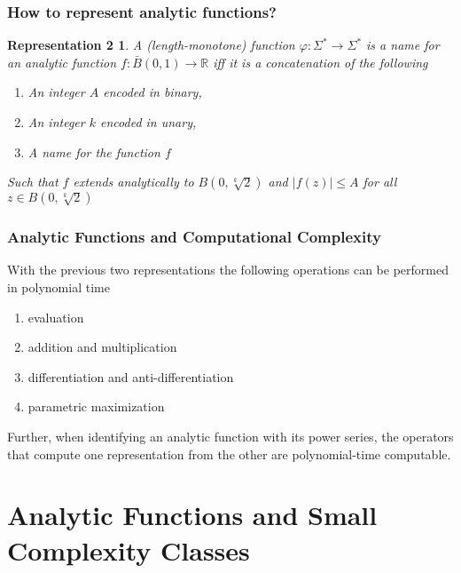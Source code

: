 \documentclass[xcolor=pdftex,dvipsnames,table]{beamer}
\newcommand{\R}{\ensuremath{\mathbb{R}}}
\newcommand{\abs}[1]{\left|#1\right|}
\newtheorem{representation2}{Representation 2}
\begin{document}
\begin{frame}
\frametitle{How to represent analytic functions?}
\begin{representation2}
  A (length-monotone) function $\varphi: \Sigma^* \to \Sigma^*$ is a name for an analytic function $f:\bar B(0,1) \to \R$ iff it is a concatenation of the following  
  \begin{enumerate}
  \item An integer $A$ encoded in binary,
  \item An integer $k$ encoded in unary,
  \item A name for the function $f$
  \end{enumerate}
  Such that $f$ extends analytically to $B(0, \sqrt[k]{2})$ and $\abs{f(z)} \leq A$ for all $z \in B(0, \sqrt[k]{2})$
\end{representation2}
\end{frame}
\begin{frame}
\frametitle{Analytic Functions and Computational Complexity}
\begin{theorem}
  With the previous two representations the following operations can be performed in polynomial time
\begin{enumerate}
\item evaluation
\item addition and multiplication
\item differentiation and anti-differentiation
\item parametric maximization
\end{enumerate}
Further, when identifying an analytic function with its power series, the operators that compute one representation from the other are polynomial-time computable.
\end{theorem}
\end{frame}
\section{Analytic Functions and Small Complexity Classes}
\end{document}
